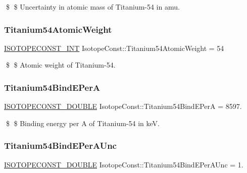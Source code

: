 \$ \$ Uncertainty in atomic mass of Titanium-\/54 in amu. \mbox{\label{group___isotope_const-_titanium-_ti54_ga23e112f5bfe83c0f3f829b72ccaef8e3}} 
\subsubsection{\texorpdfstring{Titanium54\+Atomic\+Weight}{Titanium54AtomicWeight}}
{\footnotesize\ttfamily \mbox{\hyperlink{group___isotope_const-_macros_ga5f18360b3e99483a35c32d789e62621c}{I\+S\+O\+T\+O\+P\+E\+C\+O\+N\+S\+T\+\_\+\+I\+NT}} Isotope\+Const\+::\+Titanium54\+Atomic\+Weight = 54}

\$ \$ Atomic weight of Titanium-\/54. \mbox{\label{group___isotope_const-_titanium-_ti54_ga32984e10509841e63e4504e0b6e962cb}} 
\subsubsection{\texorpdfstring{Titanium54\+Bind\+E\+PerA}{Titanium54BindEPerA}}
{\footnotesize\ttfamily \mbox{\hyperlink{group___isotope_const-_macros_ga8f45a7272ce02c0b4c65c44636ed719a}{I\+S\+O\+T\+O\+P\+E\+C\+O\+N\+S\+T\+\_\+\+D\+O\+U\+B\+LE}} Isotope\+Const\+::\+Titanium54\+Bind\+E\+PerA = 8597.}

\$ \$ Binding energy per A of Titanium-\/54 in keV. \mbox{\label{group___isotope_const-_titanium-_ti54_ga396eb3022801e2082d99be82752b0bc9}} 
\subsubsection{\texorpdfstring{Titanium54\+Bind\+E\+Per\+A\+Unc}{Titanium54BindEPerAUnc}}
{\footnotesize\ttfamily \mbox{\hyperlink{group___isotope_const-_macros_ga8f45a7272ce02c0b4c65c44636ed719a}{I\+S\+O\+T\+O\+P\+E\+C\+O\+N\+S\+T\+\_\+\+D\+O\+U\+B\+LE}} Isotope\+Const\+::\+Titanium54\+Bind\+E\+Per\+A\+Unc = 1.}

